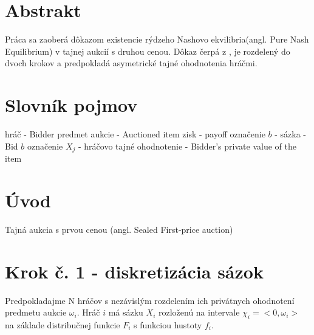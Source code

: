 \documentclass[a4paper, 11pt]{article}
\begin{document}

\newpage
\tableofcontents
\newpage
\section{Abstrakt}
Práca sa zaoberá dôkazom existencie rýdzeho Nashovo ekvilibria(angl. Pure Nash Equilibrium) v tajnej aukcií s druhou cenou. Dôkaz čerpá z \cite{Main}, je rozdelený do dvoch krokov a predpokladá asymetrické tajné ohodnotenia hráčmi.

\section{Slovník pojmov}
hráč - Bidder \newline{}
predmet aukcie - Auctioned item \newline{}
zisk - payoff \newline{}
označenie $b$ - sázka - Bid $b$ \newline{}
označenie $X_{j}$ - hráčovo tajné ohodnotenie - Bidder's private value of the item \newline{}

\section{Úvod}
Tajná aukcia s prvou cenou (angl. Sealed First-price auction)
\section{Krok č. 1 - diskretizácia sázok}
Predpokladajme N hráčov s nezávislým rozdelením ich privátnych ohodnotení predmetu aukcie $\omega_{i}$.
Hráč $i$ má sázku $X_{i}$ rozloženú na intervale $\chi_{i} = <0,\omega_{i}>$ na základe distribučnej funkcie $F_{i}$ s funkciou hustoty $f_{i}$.
\end{document}
